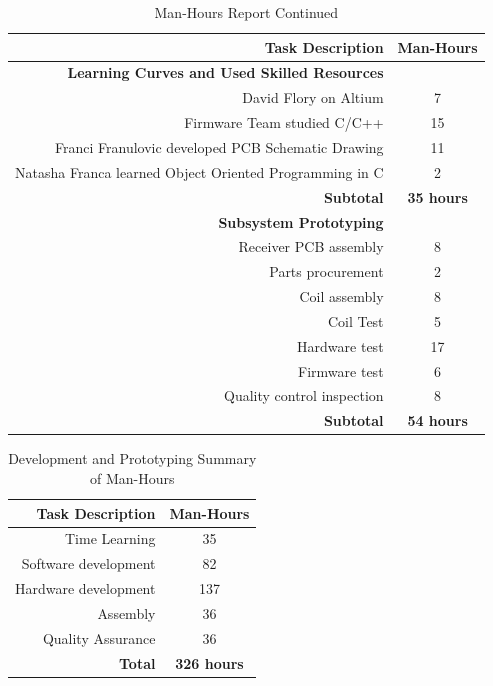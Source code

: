 \documentclass[12pt]{article}
\begin{document}
\hfill
\pagebreak
\hfill

\begin{table}[h!]
\centering
\caption*{Man-Hours Report Continued}
\begin{tabular}{ | r | c | }
\hline
\hline
\textbf{Task Description} & \textbf{Man-Hours}\\
\hline
\hline
\hline
\textbf{Learning Curves and Used Skilled Resources} & \\
 \hline 
David Flory on Altium &  7 \\
 \hline
Firmware Team studied C/C++ & 15 \\
 \hline
Franci Franulovic developed PCB Schematic Drawing & 11 \\
 \hline
Natasha Franca learned Object Oriented Programming in C & 2 \\
 \hline
\textbf{Subtotal} & \textbf{35 hours}\\
\hline
\hline
\textbf{Subsystem Prototyping} & \\
 \hline 
Receiver PCB assembly & 8 \\
 \hline
Parts procurement & 2 \\
 \hline
Coil assembly  & 8\\
 \hline
Coil Test & 5 \\
 \hline
Hardware test & 17 \\
 \hline
Firmware test & 6\\
 \hline
Quality control inspection & 8 \\
\hline
\textbf{Subtotal} & \textbf{54 hours} \\
\hline
\end{tabular}
\end{table}

\hfill 

\begin{table}[h!]
\centering
\caption{Development and Prototyping Summary of Man-Hours}
\begin{tabular} { | r | c | }
\hline
\textbf{Task Description} & \textbf{Man-Hours} \\
\hline
Time Learning & 35\\
\hline
Software development & 82 \\
 \hline
Hardware development & 137 \\
 \hline
Assembly & 36\\
 \hline
Quality Assurance & 36\\
 \hline
\textbf{Total} & \textbf{326 hours}\\
\hline
\end{tabular}
\end{table}
\end{document}
